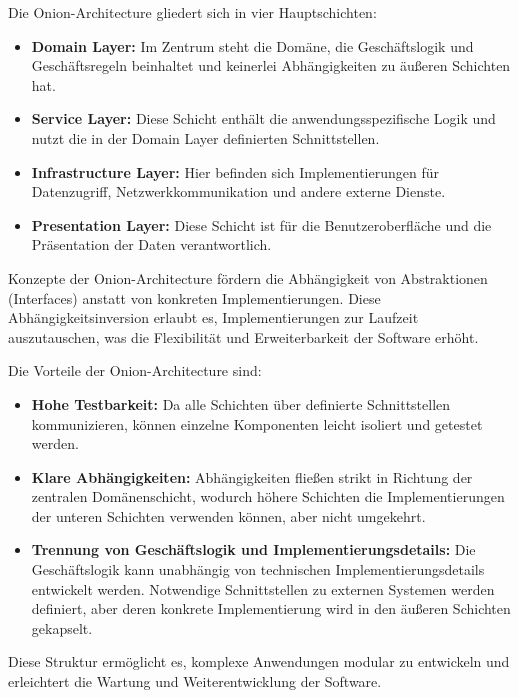 \newpage

Die Onion-Architecture gliedert sich in vier Hauptschichten:

\begin{itemize}
\item \textbf{Domain Layer:} Im Zentrum steht die Domäne, die Geschäftslogik und Geschäftsregeln beinhaltet und keinerlei Abhängigkeiten zu äußeren Schichten hat.
\item \textbf{Service Layer:} Diese Schicht enthält die anwendungsspezifische Logik und nutzt die in der Domain Layer definierten Schnittstellen.
\item \textbf{Infrastructure Layer:} Hier befinden sich Implementierungen für Datenzugriff, Netzwerkkommunikation und andere externe Dienste.
\item \textbf{Presentation Layer:} Diese Schicht ist für die Benutzeroberfläche und die Präsentation der Daten verantwortlich.
\end{itemize}

Konzepte der Onion-Architecture fördern die Abhängigkeit von Abstraktionen (Interfaces) anstatt von konkreten Implementierungen. Diese Abhängigkeitsinversion erlaubt es, Implementierungen zur Laufzeit auszutauschen, was die Flexibilität und Erweiterbarkeit der Software erhöht.

Die Vorteile der Onion-Architecture sind:

\begin{itemize}
\item \textbf{Hohe Testbarkeit:} Da alle Schichten über definierte Schnittstellen kommunizieren, können einzelne Komponenten leicht isoliert und getestet werden.
\item \textbf{Klare Abhängigkeiten:} Abhängigkeiten fließen strikt in Richtung der zentralen Domänenschicht, wodurch höhere Schichten die Implementierungen der unteren Schichten verwenden können, aber nicht umgekehrt.
\item \textbf{Trennung von Geschäftslogik und Implementierungsdetails:} Die Geschäftslogik kann unabhängig von technischen Implementierungsdetails entwickelt werden. Notwendige Schnittstellen zu externen Systemen werden definiert, aber deren konkrete Implementierung wird in den äußeren Schichten gekapselt.
\end{itemize}

Diese Struktur ermöglicht es, komplexe Anwendungen modular zu entwickeln und erleichtert die Wartung und Weiterentwicklung der Software. \autocite{CodeMaze2024}

